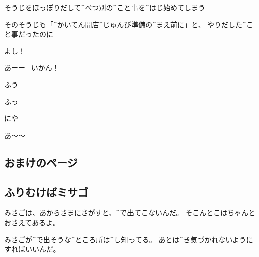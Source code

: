 \page[148]
\Alpha そうじをほっぽりだして^{べつ}{別}の^{こと}{事}を^{はじ}{始}めてしまう

\page[149]
\Alpha そのそうじも「^{かいてん}{開店}^{じゅんび}{準備}の^{まえ}{前}に」と、
やりだした^{こと}{事}だったのに

\page[154]
\Alpha よし！

\Alpha あーー
\ いかん！

\page[156]
\Alpha ふう

\page[158]
\Alpha ふっ

\Alpha にや

\page[160]
\Alpha あ〜〜


\subsection{おまけのページ}


\subsection{ふりむけばミサゴ}
\Takahiro みさごは、あからさまにさがすと、^{で}{出}てこないんだ。
そこんとこはちゃんとおさえてあるよ。

\Takahiro みさごが^{で}{出}そうな^{ところ}{所}は^{し}{知}ってる。
あとは^{き}{気}づかれないようにすればいいんだ。

